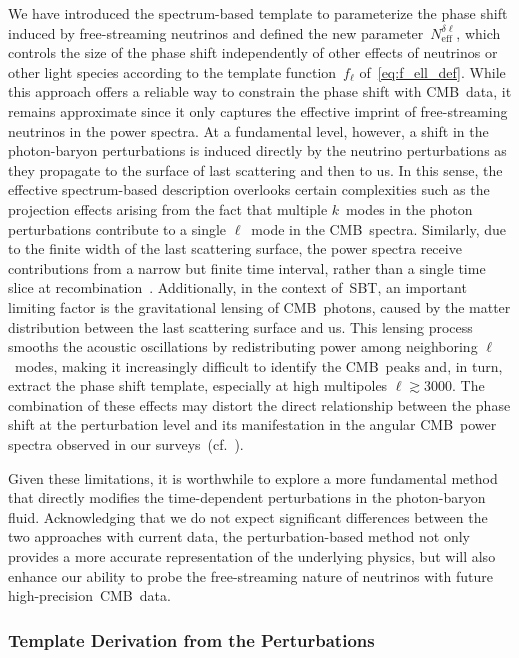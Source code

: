 \documentclass[11pt]{article}
\numberwithin{equation}{section}
\newcommand{\Nmultipole}{N_\mathrm{eff}^{\delta\ell}}
\begin{document}
We have introduced the spectrum-based template to parameterize the phase shift induced by free-streaming neutrinos and defined the new parameter~$\Nmultipole$, which controls the size of the phase shift independently of other effects of neutrinos or other light species according to the template function~$f_\ell$ of~\eqref{eq:f_ell_def}. While this approach offers a reliable way to constrain the phase shift with CMB~data, it remains approximate since it only captures the effective imprint of free-streaming neutrinos in the power spectra. At a fundamental level, however, a shift in the photon-baryon perturbations is induced directly by the neutrino perturbations as they propagate to the surface of last scattering and then to us. In this sense, the effective spectrum-based description overlooks certain complexities such as the projection effects arising from the fact that multiple $k$~modes in the photon perturbations contribute to a single $\ell$~mode in the CMB~spectra. Similarly, due to the finite width of the last scattering surface, the power spectra receive contributions from a narrow but finite time interval, rather than a single time slice at recombination~\cite{Hu:1997hp, Pan:2016zla}. Additionally, in the context of~SBT, an important limiting factor is the gravitational lensing of CMB~photons, caused by the matter distribution between the last scattering surface and us. This lensing process smooths the acoustic oscillations by redistributing power among neighboring $\ell$~modes, making it increasingly difficult to identify the CMB~peaks and, in turn, extract the phase shift template, especially at high multipoles $\ell \gtrsim 3000$. The combination of these effects may distort the direct relationship between the phase shift at the perturbation level and its manifestation in the angular CMB~power spectra observed in our surveys~(cf.~\cite{Pan:2016zla}).\medskip

Given these limitations, it is worthwhile to explore a more fundamental method that directly modifies the time-dependent perturbations in the photon-baryon fluid. Acknowledging that we do not expect significant differences between the two approaches with current data, the perturbation-based method not only provides a more accurate representation of the underlying physics, but will also enhance our ability to probe the free-streaming nature of neutrinos with future high-precision~CMB~data.


\subsubsection{Template Derivation from the Perturbations}
\label{sec:perturbation-template}
\end{document}
